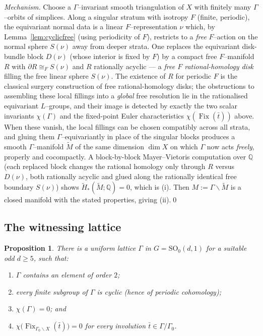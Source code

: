 \documentclass[12pt]{article}
\newcommand{\bQ}{\mathbb{Q}}
\newcommand{\Fix}{\operatorname{Fix}}
\newtheorem{proposition}{Proposition}
\theoremstyle{definition}
\begin{document}
\medskip
\noindent\emph{Mechanism.}  Choose a $\Gamma$--invariant smooth triangulation of
$X$ with finitely many $\Gamma$--orbits of simplices.  Along a singular stratum
with isotropy $F$ (finite, periodic), the equivariant normal data is a linear
$F$--representation $\nu$ which, by Lemma~\ref{lem:cyclicfree} (using periodicity
of $F$), restricts to a \emph{free} $F$--action on the normal sphere $S(\nu)$ away
from deeper strata.  One replaces the equivariant disk-bundle block
$D(\nu)$ \textup{(}whose interior is fixed by $F$\textup{)} by a compact free
$F$--manifold $R$ with $\partial R\cong_F S(\nu)$ and $R$ rationally acyclic --- a
\emph{free $F$ rational-homology disk} filling the free linear sphere $S(\nu)$.
The existence of $R$ for periodic $F$ is the classical surgery construction of
free rational-homology disks; the obstructions to assembling these local fillings
into a \emph{global} free resolution lie in the rationalised equivariant
$L$--groups, and their image is detected by exactly the two scalar invariants
$\chi(\Gamma)$ and the fixed-point Euler characteristics
$\chi(\Fix(\bar t))$ above.  When these vanish, the local fillings can be chosen
compatibly across all strata, and gluing them $\Gamma$--equivariantly in place of
the singular blocks produces a smooth $\Gamma$--manifold $\widetilde M$ of the
same dimension $\dim X$ on which $\Gamma$ now acts \emph{freely}, properly and
cocompactly.  A block-by-block Mayer--Vietoris computation over $\bQ$
\textup{(}each replaced block changes the rational homology only through $R$
versus $D(\nu)$, both rationally acyclic and glued along the rationally identical
free boundary $S(\nu)$\textup{)} shows $\widetilde H_*(\widetilde M;\bQ)=0$,
which is (i).  Then $M:=\Gamma\backslash\widetilde M$ is a closed manifold with
the stated properties, giving (ii).\qed

\subsection{The witnessing lattice}

\begin{proposition}\label{prop:witness}
There is a uniform lattice $\Gamma$ in $G=\mathrm{SO}_0(d,1)$ for a suitable odd
$d\ge 5$, such that:
\begin{enumerate}
\item[\textup{(a)}] $\Gamma$ contains an element of order $2$;
\item[\textup{(b)}] every finite subgroup of $\Gamma$ is cyclic
\textup{(}hence of periodic cohomology\textup{)};
\item[\textup{(c)}] $\chi(\Gamma)=0$; and
\item[\textup{(d)}] $\chi\bigl(\Fix_{\Gamma_0\backslash X}(\bar t)\bigr)=0$ for
every involution $\bar t\in\Gamma/\Gamma_0$.
\end{enumerate}
\end{proposition}
\end{document}
